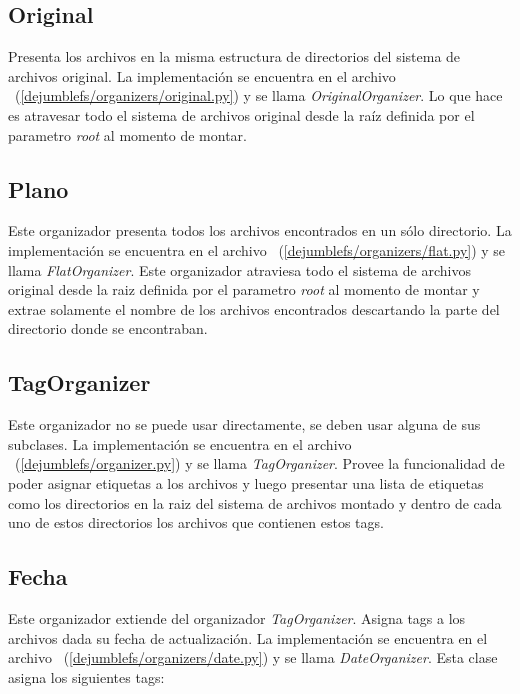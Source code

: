 \subsection{Original}

Presenta los archivos en la misma estructura de directorios del sistema de archivos original. La implementación se encuentra en el archivo ~(\ref{dejumblefs/organizers/original.py}) y se llama \textit{OriginalOrganizer}. Lo que hace es atravesar todo el sistema de archivos original desde la raíz definida por el parametro \textit{root} al momento de montar.

\subsection{Plano}

Este organizador presenta todos los archivos encontrados en un sólo directorio. La implementación se encuentra en el archivo ~(\ref{dejumblefs/organizers/flat.py}) y se llama \textit{FlatOrganizer}. Este organizador atraviesa todo el sistema de archivos original desde la raiz definida por el parametro \textit{root} al momento de montar y extrae solamente el nombre de los archivos encontrados descartando la parte del directorio donde se encontraban.

\subsection{TagOrganizer}

Este organizador no se puede usar directamente, se deben usar alguna de sus subclases. La implementación se encuentra en el archivo ~(\ref{dejumblefs/organizer.py}) y se llama \textit{TagOrganizer}. Provee la funcionalidad de poder asignar etiquetas a los archivos y luego presentar una lista de etiquetas como los directorios en la raiz del sistema de archivos montado y dentro de cada uno de estos directorios los archivos que contienen estos tags.

\subsection{Fecha}

Este organizador extiende del organizador \textit{TagOrganizer}. Asigna tags a los archivos dada su fecha de actualización. La implementación se encuentra en el archivo ~(\ref{dejumblefs/organizers/date.py}) y se llama \textit{DateOrganizer}. Esta clase asigna los siguientes tags:

